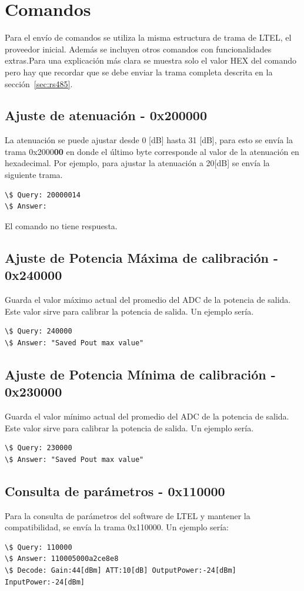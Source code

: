 \documentclass[12pt,twoside,onecolumn]{article}
\begin{document}
\section{Comandos}

Para el envío de comandos se utiliza la misma estructura de trama de LTEL, el proveedor inicial. Además se incluyen otros comandos con funcionalidades extras.Para una explicación más clara se muestra solo el valor HEX del comando pero hay que recordar que se debe enviar la trama completa descrita en la sección~\ref{sec:rs485}. 

\subsection{Ajuste de atenuación - 0x200000}
La atenuación se puede ajustar desde 0 [dB] hasta 31 [dB], para esto se envía la trama 0x2000\textbf{00} en donde el último byte corresponde al valor de la atenuación en hexadecimal. Por ejemplo, para ajustar la atenuación a 20[dB] se envía la siguiente trama.
\begin{verbatim}
\$ Query: 20000014
\$ Answer:
\end{verbatim}
 El comando no tiene respuesta.

\subsection{Ajuste de Potencia Máxima de calibración - 0x240000}
Guarda el valor máximo actual del promedio del ADC de la potencia de salida. Este valor sirve para calibrar la potencia de salida. Un ejemplo sería.
\begin{verbatim}
\$ Query: 240000
\$ Answer: "Saved Pout max value"
\end{verbatim}

\subsection{Ajuste de Potencia Mínima de calibración - 0x230000}
Guarda el valor mínimo actual del promedio del ADC de la potencia de salida. Este valor sirve para calibrar la potencia de salida. Un ejemplo sería.
\begin{verbatim}
\$ Query: 230000
\$ Answer: "Saved Pout max value"
\end{verbatim}

\subsection{Consulta de parámetros - 0x110000}\label{sec:ltel-param}
Para la consulta de parámetros del software de LTEL y mantener la compatibilidad, se envía la trama 0x110000. Un ejemplo sería:
\begin{verbatim}
\$ Query: 110000
\$ Answer: 110005000a2ce8e8
\$ Decode: Gain:44[dBm] ATT:10[dB] OutputPower:-24[dBm] InputPower:-24[dBm]
\end{verbatim}
\end{document}
